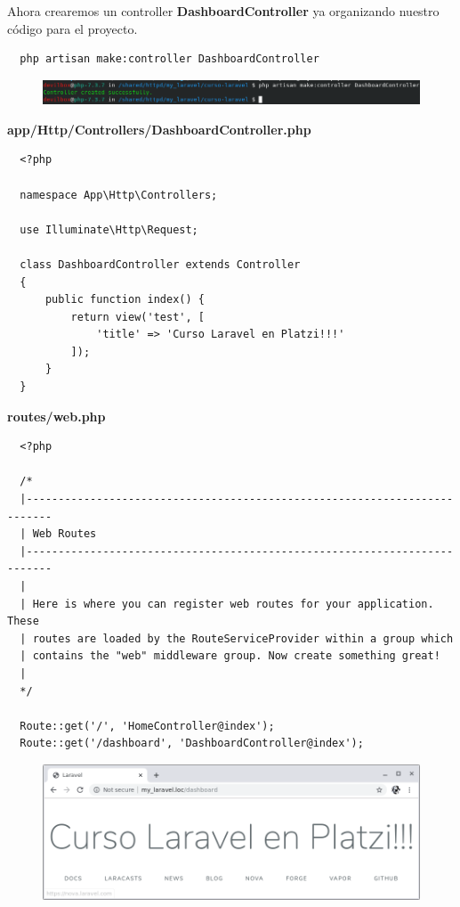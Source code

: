 \documentclass{article}
\begin{document}
Ahora crearemos un controller \textbf{DashboardController} ya organizando
nuestro código para el proyecto.\\

\begin{verbatim}
  php artisan make:controller DashboardController
\end{verbatim}

\begin{figure}[h!]
  \centering
  \includegraphics[scale=0.75]{./Pictures/014_dashboardController.png}
\end{figure}

\textbf{app/Http/Controllers/DashboardController.php}
\begin{verbatim}
  <?php

  namespace App\Http\Controllers;

  use Illuminate\Http\Request;

  class DashboardController extends Controller
  {
      public function index() {
          return view('test', [
              'title' => 'Curso Laravel en Platzi!!!'
          ]);
      }
  }
\end{verbatim}


\textbf{routes/web.php}
\begin{verbatim}
  <?php

  /*
  |--------------------------------------------------------------------------
  | Web Routes
  |--------------------------------------------------------------------------
  |
  | Here is where you can register web routes for your application. These
  | routes are loaded by the RouteServiceProvider within a group which
  | contains the "web" middleware group. Now create something great!
  |
  */

  Route::get('/', 'HomeController@index');
  Route::get('/dashboard', 'DashboardController@index');
\end{verbatim}

\begin{figure}[h!]
  \centering
  \includegraphics[scale=0.5]{./Pictures/013_dashboardController.png}
\end{figure}
\end{document}
